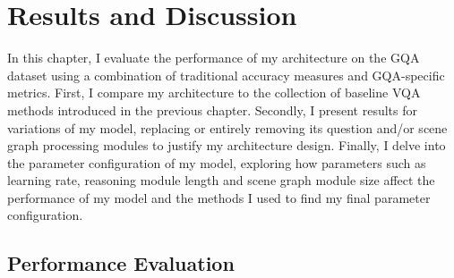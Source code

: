 \chapter{Results and Discussion}
\label{chapter:results}

In this chapter, I evaluate the performance of my architecture on the GQA dataset using a combination of traditional accuracy measures and GQA-specific metrics. First, I compare my architecture to the collection of baseline VQA methods introduced in the previous chapter. Secondly, I present results for variations of my model, replacing or entirely removing its question and/or scene graph processing modules to justify my architecture design. Finally, I delve into the parameter configuration of my model, exploring how parameters such as learning rate, reasoning module length and scene graph module size affect the performance of my model and the methods I used to find my final parameter configuration.

\section{Performance Evaluation}
\label{section:performance_evaluation}

